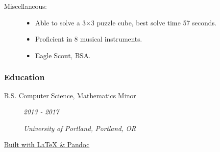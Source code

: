 \documentclass{article}
\begin{document}
\begin{description}
            \vspace{0.5em}

        \item[Miscellaneous:] \hfill
            \begin{itemize}
                \item Able to solve a 3$\times$3 puzzle cube, best solve time 57 seconds.
                \item Proficient in 8 musical instruments.
                \item Eagle Scout, BSA.
        \end{itemize}
    \end{description}
    
\subsubsection*{Education}
    \begin{description}
        \item[B.S. Computer Science, Mathematics Minor]\hfill \textit{2013 - 2017}

        \textit{University of Portland, Portland, OR}


    \end{description}
    
    \begin{center}
	\vspace{.25in}
    \href{https://www.github.com/BurnsCommaLucas/Resume}{\small Built with \LaTeX \hspace{0.001in} \& Pandoc }
    \end{center}
\end{document}
